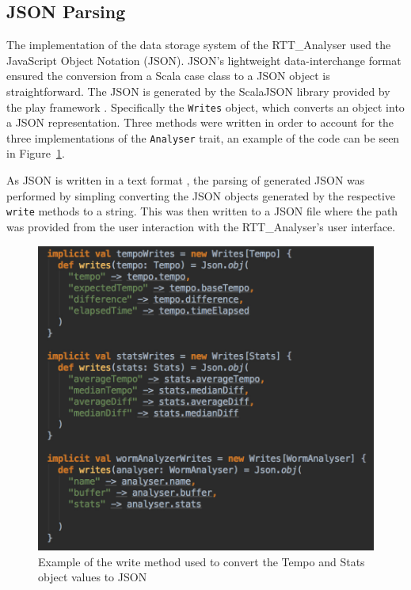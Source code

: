 \documentclass[a4paper, 11pt]{article}
\begin{document}
\subsection{JSON Parsing}

The implementation of the data storage system of the RTT\_Analyser used the JavaScript Object Notation (JSON). JSON's lightweight data-interchange format \cite{json} ensured the conversion from a Scala case class to a JSON object is straightforward. The JSON is generated by the ScalaJSON library provided by the play framework \cite{play}. Specifically the \texttt{Writes} object, which converts an object into a JSON representation. Three methods were written in order to account for the three implementations of the \texttt{Analyser} trait, an example of the code can be seen in Figure~\ref{fig: json}.\par

As JSON is written in a text format \cite{json}, the parsing of generated JSON was performed by simpling converting the JSON objects generated by the respective \texttt{write} methods to a string. This was then written to a JSON file where the path was provided from the user interaction with the RTT\_Analyser's user interface.

\begin{figure}[h]
\centering
\includegraphics[scale=0.25]{images/writes.jpg}
\caption{Example of the write method used to convert the Tempo and Stats object values to JSON}
\label{fig: json}
\end{figure}
\end{document}
